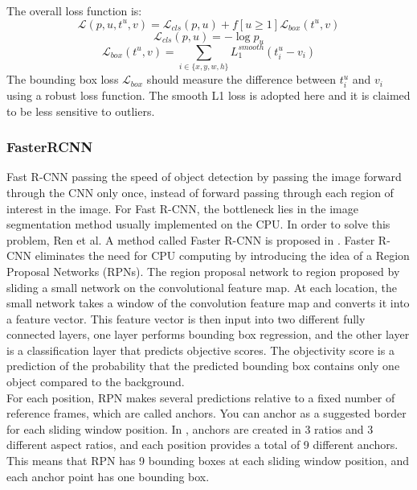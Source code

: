 The overall loss function is:
\begin{equation}
	\mathcal{L}(p, u, t^u, v) = \mathcal{L}_{cls} (p, u) + f [u \geq 1] \mathcal{L}_{box}(t^u, v)
\end{equation}\begin{equation}
	\mathcal{L}_{cls}(p, u) = -\log p_u
\end{equation}
\begin{equation}
	\mathcal{L}_{box}(t^u, v) = \sum_{i \in \{x, y, w, h\}} L_1^{smooth} (t^u_i - v_i)
\end{equation}
The bounding box loss \(\mathcal{L}_{box}\) should measure the difference between \(t^u_i\) and \(v_i\) using a robust loss function. The smooth L1 loss is adopted here and it is claimed to be less sensitive to outliers.
\subsubsection{FasterRCNN}
Fast R-CNN passing the speed of object detection by passing the image forward through the CNN only once, instead of forward passing through each region of interest in the image. For Fast R-CNN, the bottleneck lies in the image segmentation method usually implemented on the CPU. In order to solve this problem, Ren et al. A method called Faster R-CNN is proposed in \cite{DBLP:journals/corr/RenHG015}. Faster R-CNN eliminates the need for CPU computing by introducing the idea of a Region Proposal Networks (RPNs). The region proposal network to region proposed by sliding a small network on the convolutional feature map. At each location, the small network takes a window of the convolution feature map and converts it into a feature vector. This feature vector is then input into two different fully connected layers, one layer performs bounding box regression, and the other layer is a classification layer that predicts objective scores. The objectivity score is a prediction of the probability that the predicted bounding box contains only one object compared to the background.
\\For each position, RPN makes several predictions relative to a fixed number of reference frames, which are called anchors. You can anchor as a suggested border for each sliding window position. In \cite{DBLP:journals/corr/RenHG015}, anchors are created in 3 ratios and 3 different aspect ratios, and each position provides a total of 9 different anchors. This means that RPN has 9 bounding boxes at each sliding window position, and each anchor point has one bounding box.

